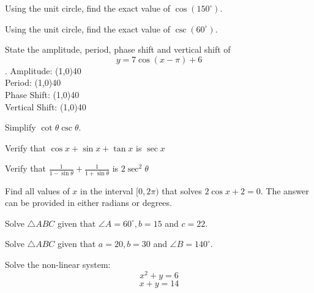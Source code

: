 \documentclass[../main.tex]{subfiles}
\begin{document}
\begin{questions}
    \question[1] Using the unit circle, find the exact value of $\cos(150^\circ)$. 
    
    \question[1] Using the unit circle, find the exact value of $\csc(60^\circ)$. 
    
    \newpage
    \question[1] State the amplitude, period, phase shift and vertical shift of $$y = 7\cos(x - \pi) + 6$$. 
    \newline
    Amplitude: \line(1,0){40} \\
    \newline
    Period: \line(1,0){40} \\
    \newline
    Phase Shift: \line(1,0){40} \\
    \newline
    Vertical Shift: \line(1,0){40}
 
    \question[1] Simplify $\cot\theta\csc\theta$. 
    
    \question[1] Verify that $\cos x + \sin x + \tan x$ is $\sec x$ 
    
    \question[1] Verify that $\frac{1}{1 - \sin\theta} + \frac{1}{1 + \sin\theta}$ is $2\sec^2\theta$ 
    
    \question[1] Find all values of $x$ in the interval $[0, 2\pi)$ that solves $2\cos x + 2 = 0$. The answer can be provided in either radians or degrees. 
    
    \newpage
    \question[1] Solve $\triangle ABC$ given that $\angle A = 60^\circ, b = 15$ and $c = 22$. 
    
    \question[1] Solve $\triangle ABC$ given that $a = 20, b = 30$ and $\angle B = 140^\circ$. 
    
    \question[1] Solve the non-linear system: $$x^2 + y = 6$$
    $$x + y = 14$$ 
    

\end{questions}
\end{document}
